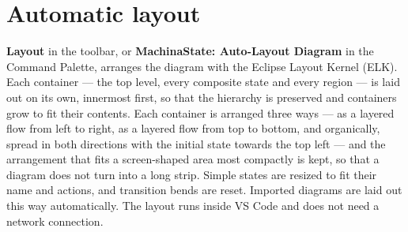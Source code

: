 \documentclass[11pt,a4paper,openany]{report}
\newcommand{\ui}[1]{\textsf{\textbf{#1}}}
\begin{document}
\section{Automatic layout}
\label{sec:layout}
\ui{Layout} in the toolbar, or \ui{MachinaState: Auto-Layout Diagram} in the Command Palette, arranges
the diagram with the Eclipse Layout Kernel (ELK). Each container --- the top level, every composite
state and every region --- is laid out on its own, innermost first, so that the hierarchy is preserved
and containers grow to fit their contents. Each container is arranged three ways --- as a layered flow
from left to right, as a layered flow from top to bottom, and organically, spread in both directions
with the initial state towards the top left --- and the arrangement that fits a screen-shaped area most
compactly is kept, so that a diagram does not turn into a long strip. Simple states are resized to
fit their name and actions, and transition bends are reset. Imported diagrams are laid out this way
automatically. The layout runs inside VS Code and does not need a network connection.
\end{document}
